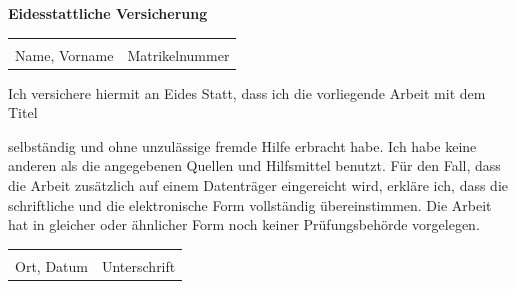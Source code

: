 \documentclass[12pt, a4paper, oneside]{article}
\begin{document}
\begingroup
\begin{center}
	\large
	\textbf{Eidesstattliche Versicherung}
\end{center}

\vspace{0.3cm}

\begin{tabular}{@{}p{8cm}p{5.8cm}}
	\underline{\hspace{6cm}} & \underline{\hspace{5.8cm}} \\
	\vspace{0.02cm}Name, Vorname & \vspace{0.02cm}Matrikelnummer \\
\end{tabular}
\vspace{0.3cm}

Ich versichere hiermit an Eides Statt, dass ich die vorliegende Arbeit mit dem Titel

\begin{center}
	{\makeatletter{\emph{{\@title}}}\makeatother}
\end{center}

selbständig und ohne unzulässige fremde Hilfe erbracht habe. Ich habe keine anderen als die angegebenen Quellen und Hilfsmittel benutzt. Für den Fall, dass die Arbeit zusätzlich auf einem Datenträger eingereicht wird, erkläre ich, dass die schriftliche und die elektronische Form vollständig übereinstimmen. Die Arbeit hat in gleicher oder ähnlicher Form noch keiner Prüfungsbehörde vorgelegen.

\vspace{0.6cm}

\begin{tabular}{@{}p{8cm}p{5.8cm}}
	\underline{\smash{Aachen, den \today}} & \underline{\hspace{5.8cm}}\\
	Ort, Datum & Unterschrift \\
\end{tabular}

\vspace{0.6cm}
\end{document}

